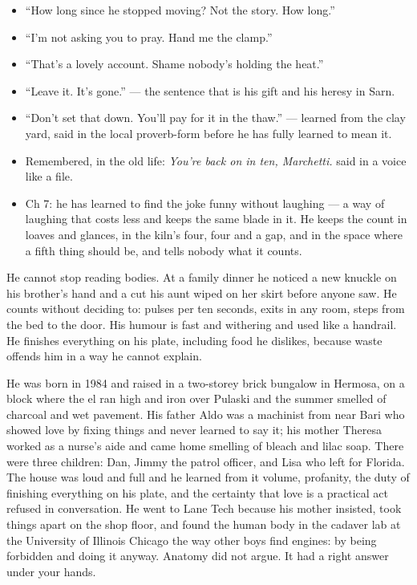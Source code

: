 \documentclass{design/chronicle}
\begin{document}
{\begin{itemize}[leftmargin=1.4em,itemsep=1pt,topsep=3pt,parsep=0pt]

\item “How long since he stopped moving? Not the story. How long.”

\item “I’m not asking you to pray. Hand me the clamp.”

\item “That’s a lovely account. Shame nobody’s holding the heat.”

\item “Leave it. It’s gone.” — the sentence that is his gift and his heresy in Sarn.

\item “Don’t set that down. You’ll pay for it in the thaw.” — learned from the clay yard, said in the local proverb-form before he has fully learned to mean it.

\item Remembered, in the old life: \emph{You’re back on in ten, Marchetti.} said in a voice like a file.

\item Ch 7: he has learned to find the joke funny without laughing --- a way of laughing that costs less and keeps the same blade in it. He keeps the count in loaves and glances, in the kiln’s four, four and a gap, and in the space where a fifth thing should be, and tells nobody what it counts.

\end{itemize}

He cannot stop reading bodies. At a family dinner he noticed a new knuckle on his brother’s hand and a cut his aunt wiped on her skirt before anyone saw. He counts without deciding to: pulses per ten seconds, exits in any room, steps from the bed to the door. His humour is fast and withering and used like a handrail. He finishes everything on his plate, including food he dislikes, because waste offends him in a way he cannot explain.

He was born in 1984 and raised in a two-storey brick bungalow in Hermosa, on a block where the el ran high and iron over Pulaski and the summer smelled of charcoal and wet pavement. His father Aldo was a machinist from near Bari who showed love by fixing things and never learned to say it; his mother Theresa worked as a nurse’s aide and came home smelling of bleach and lilac soap. There were three children: Dan, Jimmy the patrol officer, and Lisa who left for Florida. The house was loud and full and he learned from it volume, profanity, the duty of finishing everything on his plate, and the certainty that love is a practical act refused in conversation. He went to Lane Tech because his mother insisted, took things apart on the shop floor, and found the human body in the cadaver lab at the University of Illinois Chicago the way other boys find engines: by being forbidden and doing it anyway. Anatomy did not argue. It had a right answer under your hands.

}
\end{document}
